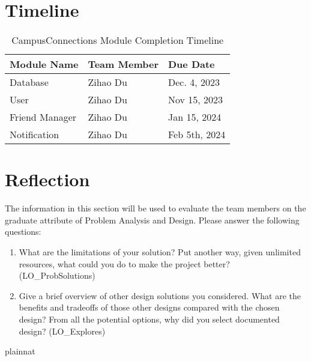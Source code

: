 \documentclass[12pt, titlepage]{article}
\begin{document}
\section{Timeline}
\begin{table}[H]
\centering
\begin{tabular}{p{} p{}  p{}}
\toprule
Module Name & Team Member & Due Date \\
\midrule
Database & Zihao Du & Dec. 4, 2023\\
User & Zihao Du & Nov 15, 2023\\
Friend Manager & Zihao Du & Jan 15, 2024\\
Notification & Zihao Du & Feb 5th, 2024\\
\bottomrule
\end{tabular}
\caption{CampusConnections Module Completion Timeline}
\end{table}

\newpage{}

\appendix

\section{Reflection}

The information in this section will be used to evaluate the team members on the
graduate attribute of Problem Analysis and Design.  Please answer the following questions:

\begin{enumerate}
  \item What are the limitations of your solution?  Put another way, given
  unlimited resources, what could you do to make the project better? (LO\_ProbSolutions)
  \item Give a brief overview of other design solutions you considered.  What
  are the benefits and tradeoffs of those other designs compared with the chosen
  design?  From all the potential options, why did you select documented design?
  (LO\_Explores)
\end{enumerate}

\newpage
 {plainnat}


\newpage{}
\end{document}
